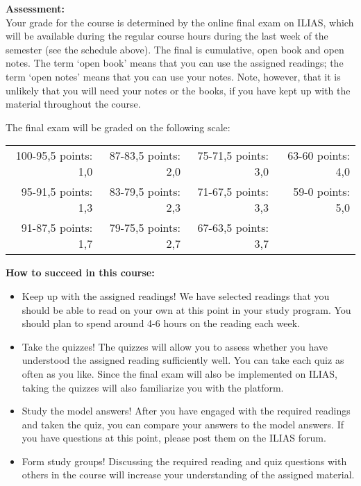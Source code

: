 \documentclass[11pt,fleqn,a4]{article}
\newcommand{\6}{\mbox{$[\hspace*{-.6mm}[$}}
\newcommand{\9}{\mbox{$]\hspace*{-.6mm}]$}}
\begin{document}
\medskip

{\bf Assessment:} 
\\ Your grade for the course is determined by the online final exam on ILIAS, which will be available during the regular course hours during the last week of the semester (see the schedule above). The final is cumulative, open book and open notes. The term `open book' means that you can use the assigned readings; the term `open notes' means that you can use your notes. Note, however, that it is unlikely that you will need your notes or the books, if you have kept up with the material throughout the course. 

The final exam will be graded on the following scale: 

\setlength{\tabcolsep}{20pt}
\begin{tabular}{rrrr}
100-95,5 points: 1,0 & 87-83,5 points: 2,0 & 75-71,5 points: 3,0 & 63-60 points: 4,0  \\ 
95-91,5 points: 1,3 & 83-79,5 points: 2,3  & 71-67,5 points: 3,3 & 59-0 points: 5,0 \\
91-87,5 points: 1,7 & 79-75,5 points: 2,7 & 67-63,5 points: 3,7 & \\
\end{tabular}

\medskip

{\bf How to succeed in this course:}

\begin{itemize}[topsep=-3pt,itemsep=-1pt]

\item Keep up with the assigned readings! We have selected readings that you should be able to read on your own at this point in your study program. You should plan to spend around 4-6 hours on the reading each week. 

\item Take the quizzes! The quizzes will allow you to assess whether you have understood the assigned reading sufficiently well. You can take each quiz as often as you like. Since the final exam will also be implemented on ILIAS, taking the quizzes will also familiarize you with the platform.

\item Study the model answers! After you have engaged with the required readings and taken the quiz, you can compare your answers to the model answers.  If you have questions at this point, please post them on the ILIAS forum.

\item Form study groups! Discussing the required reading and quiz questions with others in the course will increase your understanding of the assigned material. 

\end{itemize}
\end{document}
